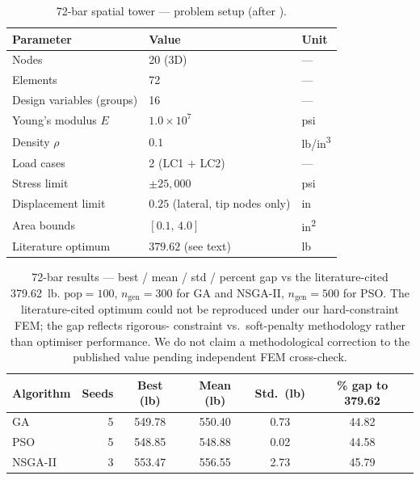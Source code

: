 \begin{table}[htbp]
  \centering
  \caption{72-bar spatial tower — problem setup (after \cite{fleury1980,erbatur2000}).}
  \label{tab:results:72bar-setup}
  \begin{tabular}{lll}
    \toprule
    Parameter               & Value                  & Unit \\
    \midrule
    Nodes                   & 20 (3D)                & --- \\
    Elements                & 72                     & --- \\
    Design variables (groups)& 16                    & --- \\
    Young's modulus $E$     & $1.0 \times 10^{7}$    & psi \\
    Density $\rho$          & $0.1$                  & lb/in\textsuperscript{3} \\
    Load cases              & 2 (LC1 + LC2)          & --- \\
    Stress limit            & $\pm 25{,}000$         & psi \\
    Displacement limit      & $0.25$ (lateral, tip nodes only) & in \\
    Area bounds             & $[0.1,\, 4.0]$         & in\textsuperscript{2} \\
    Literature optimum      & $379.62$ (see text)    & lb \\
    \bottomrule
  \end{tabular}
\end{table}

\begin{table}[htbp]
  \centering
  \caption{72-bar results — best / mean / std / percent gap vs the
    literature-cited \num{379.62}~lb. $\mathrm{pop} = 100$,
    $n_\text{gen} = 300$ for GA and NSGA-II, $n_\text{gen} = 500$
    for PSO. The literature-cited optimum could not be reproduced
    under our hard-constraint FEM; the gap reflects rigorous-
    constraint vs.\ soft-penalty methodology rather than optimiser
    performance. We do not claim a methodological correction to
    the published value pending independent FEM cross-check.}
  \label{tab:results:72bar}
  \begin{tabular}{lrSSSS}
    \toprule
    Algorithm & Seeds & {Best (lb)} & {Mean (lb)} & {Std.\ (lb)} & {\% gap to \num{379.62}} \\
    \midrule
    GA      & 5 & 549.78 & 550.40 & 0.73 & 44.82 \\
    PSO     & 5 & 548.85 & 548.88 & 0.02 & 44.58 \\
    NSGA-II & 3 & 553.47 & 556.55 & 2.73 & 45.79 \\
    \bottomrule
  \end{tabular}
\end{table}


